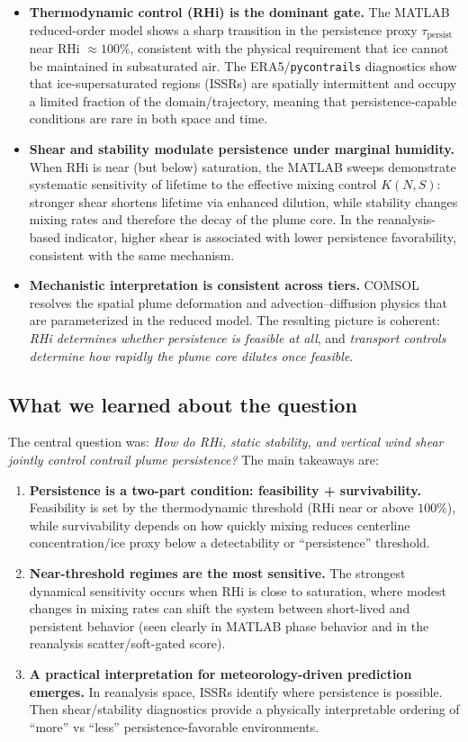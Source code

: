 \documentclass[11pt]{article}
\begin{document}
\begin{itemize}
    \item \textbf{Thermodynamic control (RHi) is the dominant gate.}
    The MATLAB reduced-order model shows a sharp transition in the persistence proxy
    $\tau_{\mathrm{persist}}$ near RHi $\approx 100\%$, consistent with the physical requirement
    that ice cannot be maintained in subsaturated air. The ERA5/\texttt{pycontrails} diagnostics
    show that ice-supersaturated regions (ISSRs) are spatially intermittent and occupy a limited
    fraction of the domain/trajectory, meaning that persistence-capable conditions are rare in
    both space and time.
    \item \textbf{Shear and stability modulate persistence under marginal humidity.}
    When RHi is near (but below) saturation, the MATLAB sweeps demonstrate systematic sensitivity
    of lifetime to the effective mixing control $K(N,S)$: stronger shear shortens lifetime via
    enhanced dilution, while stability changes mixing rates and therefore the decay of the plume
    core. In the reanalysis-based indicator, higher shear is associated with lower persistence
    favorability, consistent with the same mechanism.
    \item \textbf{Mechanistic interpretation is consistent across tiers.}
    COMSOL resolves the spatial plume deformation and advection--diffusion physics that are
    parameterized in the reduced model. The resulting picture is coherent: \emph{RHi determines
    whether persistence is feasible at all}, and \emph{transport controls determine how rapidly the
    plume core dilutes once feasible}.
\end{itemize}

\subsection{What we learned about the question}
The central question was: \emph{How do RHi, static stability, and vertical wind shear jointly
control contrail plume persistence?} The main takeaways are:

\begin{enumerate}
    \item \textbf{Persistence is a two-part condition: feasibility + survivability.}
    Feasibility is set by the thermodynamic threshold (RHi near or above $100\%$), while survivability
    depends on how quickly mixing reduces centerline concentration/ice proxy below a detectability
    or “persistence” threshold.
    \item \textbf{Near-threshold regimes are the most sensitive.}
    The strongest dynamical sensitivity occurs when RHi is close to saturation, where modest changes
    in mixing rates can shift the system between short-lived and persistent behavior (seen clearly in
    MATLAB phase behavior and in the reanalysis scatter/soft-gated score).
    \item \textbf{A practical interpretation for meteorology-driven prediction emerges.}
    In reanalysis space, ISSRs identify where persistence is possible. Then shear/stability diagnostics
    provide a physically interpretable ordering of “more” vs “less” persistence-favorable environments.
\end{enumerate}
\end{document}
